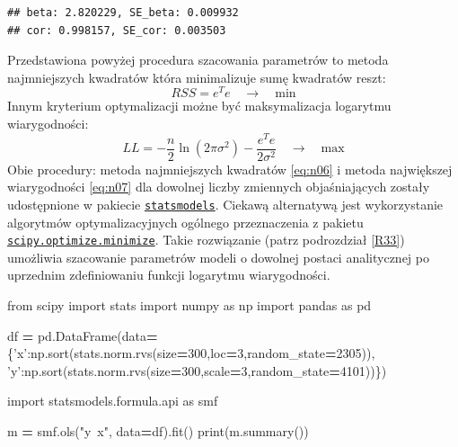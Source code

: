 \documentclass[polish,]{book}
\newenvironment{Shaded}{\begin{snugshade}}{\end{snugshade}}
\newcommand{\BuiltInTok}[1]{#1}
\newcommand{\DecValTok}[1]{\textcolor[rgb]{0.00,0.00,0.81}{#1}}
\newcommand{\ImportTok}[1]{#1}
\newcommand{\NormalTok}[1]{#1}
\newcommand{\OperatorTok}[1]{\textcolor[rgb]{0.81,0.36,0.00}{\textbf{#1}}}
\newcommand{\StringTok}[1]{\textcolor[rgb]{0.31,0.60,0.02}{#1}}
\begin{document}
\begin{verbatim}
## beta: 2.820229, SE_beta: 0.009932
## cor: 0.998157, SE_cor: 0.003503
\end{verbatim}

Przedstawiona powyżej procedura szacowania parametrów to metoda najmniejszych kwadratów która minimalizuje sumę kwadratów reszt:
\begin{equation}
RSS=e^Te\quad\longrightarrow\quad\mbox{min}
\label{eq:n06}
\end{equation}
Innym kryterium optymalizacji możne być maksymalizacja logarytmu wiarygodności:
\begin{equation}
LL=-\frac{n}{2}\ln(2\pi\sigma^2)-\frac{e^Te}{2\sigma^2}\quad\longrightarrow\quad\mbox{max}
\label{eq:n07}
\end{equation}
Obie procedury: metoda najmniejszych kwadratów \eqref{eq:n06} i metoda największej wiarygodności \eqref{eq:n07} dla dowolnej liczby zmiennych objaśniających zostały udostępnione w pakiecie \href{https://www.statsmodels.org/stable/examples/index.html\#regression}{\texttt{statsmodels}}.
Ciekawą alternatywą jest wykorzystanie algorytmów optymalizacyjnych ogólnego przeznaczenia z pakietu \href{https://docs.scipy.org/doc/scipy/reference/generated/scipy.optimize.minimize.html\#scipy.optimize.minimize}{\texttt{scipy.optimize.minimize}}. Takie rozwiązanie (patrz podrozdział \ref{R33}) umożliwia szacowanie parametrów modeli o dowolnej postaci analitycznej po uprzednim zdefiniowaniu funkcji logarytmu wiarygodności.

\begin{Shaded}
\begin{Highlighting}[]
\ImportTok{from}\NormalTok{ scipy }\ImportTok{import}\NormalTok{ stats}
\ImportTok{import}\NormalTok{ numpy }\ImportTok{as}\NormalTok{ np}
\ImportTok{import}\NormalTok{ pandas }\ImportTok{as}\NormalTok{ pd}

\NormalTok{df }\OperatorTok{=}\NormalTok{ pd.DataFrame(data}\OperatorTok{=}\NormalTok{\{}\StringTok{'x'}\NormalTok{:np.sort(stats.norm.rvs(size}\OperatorTok{=}\DecValTok{300}\NormalTok{,loc}\OperatorTok{=}\DecValTok{3}\NormalTok{,random_state}\OperatorTok{=}\DecValTok{2305}\NormalTok{)),}
                        \StringTok{'y'}\NormalTok{:np.sort(stats.norm.rvs(size}\OperatorTok{=}\DecValTok{300}\NormalTok{,scale}\OperatorTok{=}\DecValTok{3}\NormalTok{,random_state}\OperatorTok{=}\DecValTok{4101}\NormalTok{))\})}

\ImportTok{import}\NormalTok{ statsmodels.formula.api }\ImportTok{as}\NormalTok{ smf}

\NormalTok{m }\OperatorTok{=}\NormalTok{ smf.ols(}\StringTok{"y~x"}\NormalTok{, data}\OperatorTok{=}\NormalTok{df).fit()}
\BuiltInTok{print}\NormalTok{(m.summary())}
\end{Highlighting}
\end{Shaded}
\end{document}
